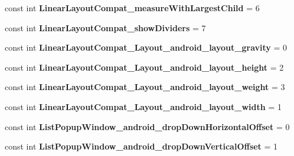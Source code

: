 \begin{DoxyCompactItemize}
\item 
\hypertarget{classClient_1_1Droid_1_1Resource_1_1Styleable_a200fd7cdc868f46a6850dec61a434673}{}const int {\bfseries Linear\+Layout\+Compat\+\_\+measure\+With\+Largest\+Child} = 6\label{classClient_1_1Droid_1_1Resource_1_1Styleable_a200fd7cdc868f46a6850dec61a434673}

\item 
\hypertarget{classClient_1_1Droid_1_1Resource_1_1Styleable_ac9a0508d24b45eb3f6843a529c75c512}{}const int {\bfseries Linear\+Layout\+Compat\+\_\+show\+Dividers} = 7\label{classClient_1_1Droid_1_1Resource_1_1Styleable_ac9a0508d24b45eb3f6843a529c75c512}

\item 
\hypertarget{classClient_1_1Droid_1_1Resource_1_1Styleable_ae9d50fce2d32531344d32b7552f15f20}{}const int {\bfseries Linear\+Layout\+Compat\+\_\+\+Layout\+\_\+android\+\_\+layout\+\_\+gravity} = 0\label{classClient_1_1Droid_1_1Resource_1_1Styleable_ae9d50fce2d32531344d32b7552f15f20}

\item 
\hypertarget{classClient_1_1Droid_1_1Resource_1_1Styleable_a682f9e354fe43d3c1aa7bfe6cdf61bb7}{}const int {\bfseries Linear\+Layout\+Compat\+\_\+\+Layout\+\_\+android\+\_\+layout\+\_\+height} = 2\label{classClient_1_1Droid_1_1Resource_1_1Styleable_a682f9e354fe43d3c1aa7bfe6cdf61bb7}

\item 
\hypertarget{classClient_1_1Droid_1_1Resource_1_1Styleable_aca0049163274c9a6fcb7005584a3d2d9}{}const int {\bfseries Linear\+Layout\+Compat\+\_\+\+Layout\+\_\+android\+\_\+layout\+\_\+weight} = 3\label{classClient_1_1Droid_1_1Resource_1_1Styleable_aca0049163274c9a6fcb7005584a3d2d9}

\item 
\hypertarget{classClient_1_1Droid_1_1Resource_1_1Styleable_a4a0639e29ba4b291e66aefdce9924565}{}const int {\bfseries Linear\+Layout\+Compat\+\_\+\+Layout\+\_\+android\+\_\+layout\+\_\+width} = 1\label{classClient_1_1Droid_1_1Resource_1_1Styleable_a4a0639e29ba4b291e66aefdce9924565}

\item 
\hypertarget{classClient_1_1Droid_1_1Resource_1_1Styleable_a7c4fc19ce6fb14d94795c82880f31379}{}const int {\bfseries List\+Popup\+Window\+\_\+android\+\_\+drop\+Down\+Horizontal\+Offset} = 0\label{classClient_1_1Droid_1_1Resource_1_1Styleable_a7c4fc19ce6fb14d94795c82880f31379}

\item 
\hypertarget{classClient_1_1Droid_1_1Resource_1_1Styleable_af4cd85e73bb375b7730ff93a691797bf}{}const int {\bfseries List\+Popup\+Window\+\_\+android\+\_\+drop\+Down\+Vertical\+Offset} = 1\label{classClient_1_1Droid_1_1Resource_1_1Styleable_af4cd85e73bb375b7730ff93a691797bf}


\end{DoxyCompactItemize}
